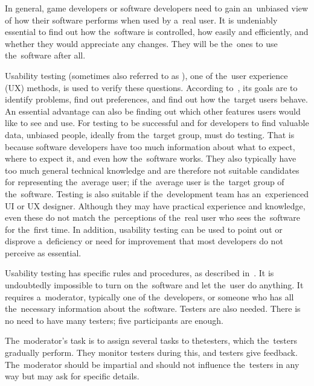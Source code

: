 In general, game developers or software developers need to gain an~unbiased view of how their software performs when used by a~real user.
It is undeniably essential to find out how the~software is controlled, how easily and efficiently, and whether they would appreciate any changes.
They will be the~ones to use the~software after all.

Usability testing (sometimes also referred to as ), one of the~user experience (UX) methods, is used to verify these questions.
\linebreak
According to~\cite{moran_2019_usability}, its goals are to identify problems, find out preferences, and find out how the~target users behave.
An essential advantage can also be finding out which other features users would like to see and use.
For testing to be successful and for developers to find valuable data, unbiased people, ideally from the~target group, must do testing.
That is because software developers have too much information about what to expect, where to expect it, and even how the~software works.
They also typically have too much general technical knowledge and are therefore not suitable candidates for representing the~average user; if the~average user is the~target group of the~software.
Testing is also suitable if the~development team has an~experienced UI or UX designer.
Although they may have practical experience and knowledge, even these do not match the~perceptions of the~real user who sees the~software for the~first time.
\linebreak
In addition, usability testing can be used to point out or disprove a~deficiency or need for improvement that most developers do not perceive as essential.

Usability testing has specific rules and procedures, as described in~\cite{moran_2019_usability}.
\linebreak
It is undoubtedly impossible to turn on the~software and let the~user do anything.
It requires a~moderator, typically one of the~developers, or someone who has all the~necessary information about the~software.
Testers are also needed.
There is no need to have many testers; five participants are enough.

\pagebreak

The~moderator's task is to assign several tasks to the\linebreak{}testers, which the~testers gradually perform.
They monitor testers during this, and testers give feedback.
The~moderator should be impartial and should not influence the~testers in any way but may ask for specific details.

